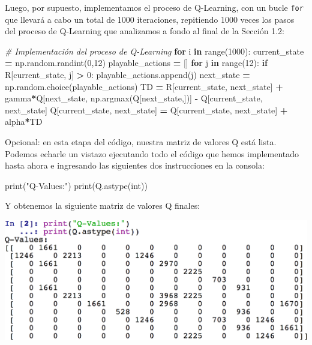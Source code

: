 \documentclass[]{book}
\newenvironment{Shaded}{\begin{snugshade}}{\end{snugshade}}
\newcommand{\BuiltInTok}[1]{#1}
\newcommand{\CommentTok}[1]{\textcolor[rgb]{0.56,0.35,0.01}{\textit{#1}}}
\newcommand{\ControlFlowTok}[1]{\textcolor[rgb]{0.13,0.29,0.53}{\textbf{#1}}}
\newcommand{\DecValTok}[1]{\textcolor[rgb]{0.00,0.00,0.81}{#1}}
\newcommand{\KeywordTok}[1]{\textcolor[rgb]{0.13,0.29,0.53}{\textbf{#1}}}
\newcommand{\NormalTok}[1]{#1}
\newcommand{\OperatorTok}[1]{\textcolor[rgb]{0.81,0.36,0.00}{\textbf{#1}}}
\newcommand{\StringTok}[1]{\textcolor[rgb]{0.31,0.60,0.02}{#1}}
\begin{document}
Luego, por supuesto, implementamos el proceso de Q-Learning, con un bucle \texttt{for} que llevará a cabo un total de 1000 iteraciones, repitiendo 1000 veces los pasos del proceso de Q-Learning que analizamos a fondo al final de la Sección 1.2:

\begin{Shaded}
\begin{Highlighting}[]
\CommentTok{# Implementación del proceso de Q-Learning}
\ControlFlowTok{for}\NormalTok{ i }\KeywordTok{in} \BuiltInTok{range}\NormalTok{(}\DecValTok{1000}\NormalTok{):}
\NormalTok{    current_state }\OperatorTok{=}\NormalTok{ np.random.randint(}\DecValTok{0}\NormalTok{,}\DecValTok{12}\NormalTok{)}
\NormalTok{    playable_actions }\OperatorTok{=}\NormalTok{ []}
    \ControlFlowTok{for}\NormalTok{ j }\KeywordTok{in} \BuiltInTok{range}\NormalTok{(}\DecValTok{12}\NormalTok{):}
        \ControlFlowTok{if}\NormalTok{ R[current_state, j] }\OperatorTok{>} \DecValTok{0}\NormalTok{:}
\NormalTok{            playable_actions.append(j)}
\NormalTok{    next_state }\OperatorTok{=}\NormalTok{ np.random.choice(playable_actions)}
\NormalTok{    TD }\OperatorTok{=}\NormalTok{ R[current_state, next_state] }\OperatorTok{+}\NormalTok{ gamma}\OperatorTok{*}\NormalTok{Q[next_state, np.argmax(Q[next_state,])]}
         \OperatorTok{-}\NormalTok{ Q[current_state, next_state]}
\NormalTok{    Q[current_state, next_state] }\OperatorTok{=}\NormalTok{ Q[current_state, next_state] }\OperatorTok{+}\NormalTok{ alpha}\OperatorTok{*}\NormalTok{TD}
\end{Highlighting}
\end{Shaded}

Opcional: en esta etapa del código, nuestra matriz de valores Q está lista. Podemos echarle un vistazo ejecutando todo el código que hemos implementado hasta ahora e ingresando las siguientes dos instrucciones en la consola:

\begin{Shaded}
\begin{Highlighting}[]
\BuiltInTok{print}\NormalTok{(}\StringTok{"Q-Values:"}\NormalTok{)}
\BuiltInTok{print}\NormalTok{(Q.astype(}\BuiltInTok{int}\NormalTok{))}
\end{Highlighting}
\end{Shaded}

Y obtenemos la siguiente matriz de valores Q finales:

\includegraphics{Images/Q_Values_Console.png}
\end{document}
